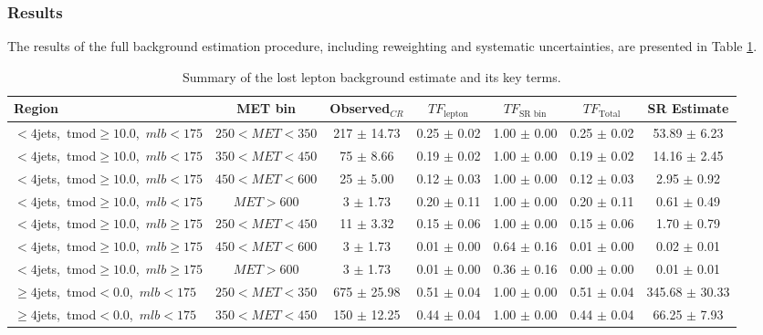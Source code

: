 \subsubsection{Results}
\label{sssec:stop:lostlep:results}

The results of the full background estimation procedure, including
reweighting and systematic uncertainties, are presented in Table
\ref{tab:stop:lostlep:results}.

\begin{table}
\centering
{\small
\caption{Summary of the lost lepton background estimate and its key terms.}
\label{tab:stop:lostlep:results}
\begin{tabular}{|l|c|c|c|c|c|c|} \hline
Region & MET bin & Observed$_{CR}$ & $TF_\text{lepton}$ & $TF_\text{SR bin}$ & $TF_\text{Total}$ & SR Estimate \\ \hline \hline
 $<4$jets,~tmod$\ge10.0$,~$mlb<175$ & $250<MET<350$  & 217 $\pm$ 14.73  & 0.25 $\pm$ 0.02  & 1.00 $\pm$ 0.00 & 0.25 $\pm$ 0.02  & 53.89 $\pm$ 6.23  \\
 $<4$jets,~tmod$\ge10.0$,~$mlb<175$ & $350<MET<450$  & 75 $\pm$ 8.66  & 0.19 $\pm$ 0.02  & 1.00 $\pm$ 0.00 & 0.19 $\pm$ 0.02  & 14.16 $\pm$ 2.45  \\
 $<4$jets,~tmod$\ge10.0$,~$mlb<175$ & $450<MET<600$  & 25 $\pm$ 5.00  & 0.12 $\pm$ 0.03  & 1.00 $\pm$ 0.00 & 0.12 $\pm$ 0.03  & 2.95 $\pm$ 0.92  \\
 $<4$jets,~tmod$\ge10.0$,~$mlb<175$ & $MET>600$  & 3 $\pm$ 1.73  & 0.20 $\pm$ 0.11  & 1.00 $\pm$ 0.00 & 0.20 $\pm$ 0.11  & 0.61 $\pm$ 0.49  \\
\hline
 $<4$jets,~tmod$\ge10.0$,~$mlb\ge175$ & $250<MET<450$  & 11 $\pm$ 3.32  & 0.15 $\pm$ 0.06  & 1.00 $\pm$ 0.00 & 0.15 $\pm$ 0.06  & 1.70 $\pm$ 0.79  \\
 $<4$jets,~tmod$\ge10.0$,~$mlb\ge175$ & $450<MET<600$  & 3 $\pm$ 1.73  & 0.01 $\pm$ 0.00  & 0.64 $\pm$ 0.16 & 0.01 $\pm$ 0.00  & 0.02 $\pm$ 0.01  \\
 $<4$jets,~tmod$\ge10.0$,~$mlb\ge175$ & $MET>600$  & 3 $\pm$ 1.73  & 0.01 $\pm$ 0.00  & 0.36 $\pm$ 0.16 & 0.00 $\pm$ 0.00  & 0.01 $\pm$ 0.01  \\
\hline
 $\ge4$jets,~tmod$<0.0$,~$mlb<175$ & $250<MET<350$  & 675 $\pm$ 25.98  & 0.51 $\pm$ 0.04  & 1.00 $\pm$ 0.00 & 0.51 $\pm$ 0.04  & 345.68 $\pm$ 30.33  \\
 $\ge4$jets,~tmod$<0.0$,~$mlb<175$ & $350<MET<450$  & 150 $\pm$ 12.25  & 0.44 $\pm$ 0.04  & 1.00 $\pm$ 0.00 & 0.44 $\pm$ 0.04  & 66.25 $\pm$ 7.93  \\

\end{tabular}}
\end{table}
